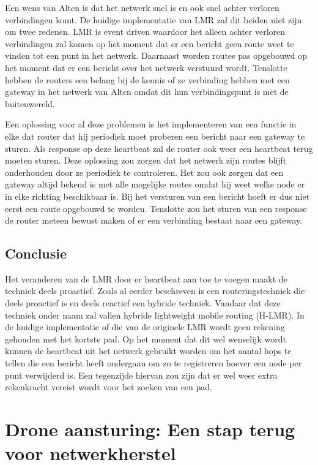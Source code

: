 \documentclass[a4paper, 11pt, oneside]{report}
\begin{document}
Een wens van Alten is dat het netwerk snel is en ook snel achter verloren verbindingen komt. 
De huidige implementatie van LMR zal dit beiden niet zijn om twee redenen.
LMR is event driven waardoor het alleen achter verloren verbindingen zal komen op het moment dat er een bericht geen route weet te vinden tot een punt in het netwerk.
Daarnaast worden routes pas opgebouwd op het moment dat er een bericht over het netwerk verstuurd wordt.
Tenslotte hebben de routers een belang bij de kennis of ze verbinding hebben met een gateway in het netwerk van Alten omdat dit hun verbindingspunt is met de buitenwereld.

Een oplossing voor al deze problemen is het implementeren van een functie in elke dat router dat hij periodiek moet proberen een bericht naar een gateway te sturen. Als response op deze heartbeat zal de router ook weer een heartbeat terug moeten sturen.
Deze oplossing zou zorgen dat het netwerk zijn routes blijft onderhouden door ze periodiek te controleren.
Het zou ook zorgen dat een gateway altijd bekend is met alle mogelijke routes omdat hij weet welke node er in elke richting beschikbaar is. Bij het versturen van een bericht hoeft er dus niet eerst een route opgebouwd te worden.
Tenslotte zou het sturen van een response de router meteen bewust maken of er een verbinding bestaat naar een gateway.

\subsection{Conclusie}  

Het veranderen van de LMR door er heartbeat aan toe te voegen maakt de techniek deels proactief. 
Zoals al eerder beschreven is een routeringstechniek die deels proactief is en deels reactief een hybride techniek.
Vandaar dat deze techniek onder naam zal vallen hybride lightweight mobile routing (H-LMR).
In de huidige implementatie of die van de originele LMR wordt geen rekening gehouden met het kortste pad.
Op het moment dat dit wel wenselijk wordt kunnen de heartbeat uit het netwerk gebruikt worden om het aantal hops te tellen die een bericht heeft ondergaan om zo te registreren hoever een node per punt verwijderd is. Een tegenzijde hiervan zou zijn dat er wel weer extra rekenkracht vereist wordt voor het zoeken van een pad.

\section{Drone aansturing: Een stap terug voor netwerkherstel}\label{sec:drone-aansturing-een-stap-terug-voor-netwerkherstel}
\end{document}
